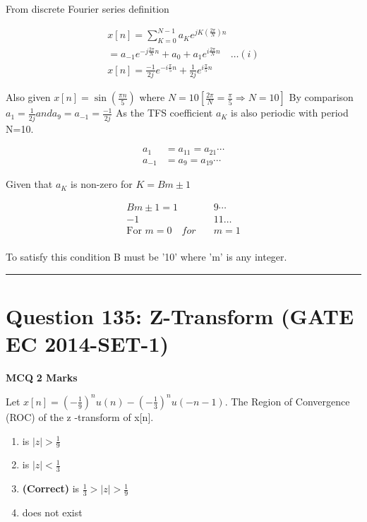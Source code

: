 \documentclass[11pt,a4paper]{article}
\begin{document}
\begin{tcolorbox}[solbox, title=Detailed Solution -- Question 134]
From discrete Fourier series definition

\[
\begin{array}{l} x[n]=\sum_{K=0}^{N-1} a_{K} e^{j K\left(\frac{2 \pi}{N}\right) n}\\ =a_{-1} e^{-j \frac{2 \pi}{N} n}+a_{0}+a_{1} e^{i \frac{2 \pi}{N} n} \quad \ldots(i)\\ x[n]=\frac{-1}{2 j} e^{-i \frac{\pi}{5} n}+\frac{1}{2 j} e^{i \frac{\pi}{5} n} \end{array}
\]

 Also given 
$x[n]=\sin \left(\frac{\pi n}{5}\right)$
 where $N=10\left[\frac{2 \pi}{N}=\frac{\pi}{5} \Rightarrow N=10\right]$
 By comparison $a_{1}=\frac{1}{2 j} and a_{9}=a_{-1}=\frac{-1}{2 j}$
 As the TFS coefficient $a_{K}$ is also periodic with period N=10.

\[
\begin{aligned} a_{1} &=a_{11}=a_{21} \cdots \\ a_{-1} &=a_{9}=a_{19} \cdots \end{aligned}
\]

 Given that $a_{K}$ is non-zero for $K=B m \pm 1$

\[
\begin{array}{cc} B m \pm 1=1& \quad 9 \cdots\\ -1 &\quad11\ldots\\ \text{For }m=0 \quad for& \quad m=1 \\ \end{array}
\]

 To satisfy this condition B must be '10' where 'm'  is any integer.
\end{tcolorbox}

\vspace{1.5em}
\hrule
\vspace{1.5em}

\section*{Question 135: Z-Transform (GATE EC 2014-SET-1)}
\noindent \textbf{\color{primary}MCQ} \hfill \textbf{\color{secondary}2 Marks}


\noindent Let $x[n]=(-\frac{1}{9})^{n} u(n)-(-\frac{1}{3})^{n} u(-n-1)$. The Region of Convergence (ROC) of the z -transform of x[n].


\begin{enumerate}[label=(\Alph*)]
    \item is $|z|>\frac{1}{9}$
    \item is $|z|<\frac{1}{3}$
    \item \textbf{(Correct)} is $\frac{1}{3}> |z|>\frac{1}{9}$
    \item does not exist
\end{enumerate}
\end{document}
